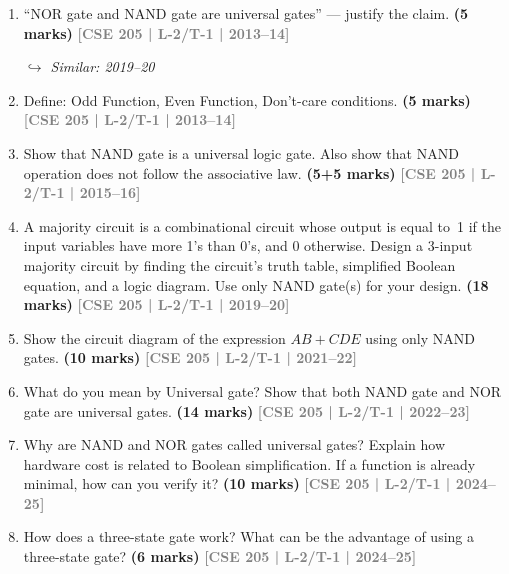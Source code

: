 \documentclass[12pt,a4paper]{article}
\newcommand{\yr}[1]{\hfill\textcolor{gray}{\small\textbf{[#1]}}}
\newcommand{\mk}[1]{\textcolor{orange!70!black}{\small\textbf{(#1 marks)}}}
\newcommand{\variant}[1]{\par\vspace{1pt}\textcolor{blue!50!black}%
  {\footnotesize\textit{$\hookrightarrow$ Similar: #1}}}
\begin{document}
\begin{enumerate}

\item ``NOR gate and NAND gate are universal gates'' --- justify the claim.
\mk{5} \yr{CSE 205 | L-2/T-1 | 2013--14}
\variant{2019--20}

\item Define: Odd Function, Even Function, Don't-care conditions.
\mk{5} \yr{CSE 205 | L-2/T-1 | 2013--14}


\item Show that NAND gate is a universal logic gate. Also show that NAND operation does not follow the associative law.
\mk{5+5} \yr{CSE 205 | L-2/T-1 | 2015--16}


\item A majority circuit is a combinational circuit whose output is equal to~1 if the input variables have more 1's than 0's, and 0 otherwise. Design a 3-input majority circuit by finding the circuit's truth table, simplified Boolean equation, and a logic diagram. Use only NAND gate(s) for your design.
\mk{18} \yr{CSE 205 | L-2/T-1 | 2019--20}

\item Show the circuit diagram of the expression $AB + CDE$ using only NAND gates.
\mk{10} \yr{CSE 205 | L-2/T-1 | 2021--22}

\item What do you mean by Universal gate? Show that both NAND gate and NOR gate are universal gates.
\mk{14} \yr{CSE 205 | L-2/T-1 | 2022--23}

\item Why are NAND and NOR gates called universal gates? Explain how hardware cost is related to Boolean simplification. If a function is already minimal, how can you verify it?
\mk{10} \yr{CSE 205 | L-2/T-1 | 2024--25}

\item How does a three-state gate work? What can be the advantage of using a three-state gate?
\mk{6} \yr{CSE 205 | L-2/T-1 | 2024--25}

\end{enumerate}
\end{document}
